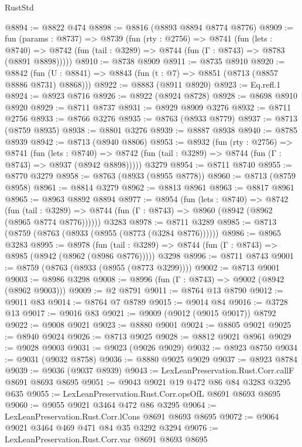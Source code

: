 \begin{lexlean}{RustStd}
\begin{coremodule}
@8894 := @8822 @474
@8898 := @8816 (@8893 @8894 @8774 @8776)
@8909 := fun (params : @8737) =>
  @8739
    (fun (rty : @2756) =>
    @8741
      (fun (lets : @8740) =>
      @8742 (fun (tail : @3289) => @8744 (fun (Γ : @8743) => @8783 (@8891 @8898)))))
@8910 := @8738 @8909
@8911 := @8735 @8910
@8920 := @8842 (fun (U : @8841) => @8843 (fun (t : @7) => @8851 (@8713 (@8857 @8886 @8731) @8868)))
@8922 := @8883 (@8911 @8920)
@8923 := Eq.refl.{1}
@8924 := @8923 @8716
@8926 := @8922 (@8924 @8728)
@8928 := @8698 @8910 @8920
@8929 := @8711 @8737
@8931 := @8929 @8909 @3276
@8932 := @8711 @2756
@8933 := @8766 @3276
@8935 := @8763 (@8933 @8779)
@8937 := @8713 (@8759 @8935)
@8938 := @8801 @3276
@8939 := @8887 @8938
@8940 := @8785 @8939
@8942 := @8713 (@8940 @8806)
@8953 := @8932
    (fun (rty : @2756) =>
    @8741
      (fun (lets : @8740) =>
      @8742 (fun (tail : @3289) => @8744 (fun (Γ : @8743) => @8937 (@8942 @8898)))))
    @3279
@8954 := @8711 @8740
@8955 := @8770 @3279
@8958 := @8763 (@8933 (@8955 @8778))
@8960 := @8713 (@8759 @8958)
@8961 := @8814 @3279
@8962 := @8813 @8961
@8963 := @8817 @8961
@8965 := @8963 @8892 @8894
@8977 := @8954
    (fun (lets : @8740) =>
    @8742
      (fun (tail : @3289) => @8744 (fun (Γ : @8743) => @8960 (@8942 (@8962 (@8965 @8774 @8776))))))
    @3283
@8978 := @8711 @3289
@8985 := @8713 (@8759 (@8763 (@8933 (@8955 (@8773 (@3284 @8776))))))
@8986 := @8965 @3283
@8995 := @8978
    (fun (tail : @3289) => @8744 (fun (Γ : @8743) => @8985 (@8942 (@8962 (@8986 @8776)))))
    @3298
@8996 := @8711 @8743
@9001 := @8759 (@8763 (@8933 (@8955 (@8773 @3299))))
@9002 := @8713 @9001
@9003 := @8986 @3298
@9008 := @8996 (fun (Γ : @8743) => @9002 (@8942 (@8962 @9003)))
@9009 := @2 @8791
@9011 := @8764 @13 @8790
@9012 := @9011 @83
@9014 := @8764 @7 @8789
@9015 := @9014 @84
@9016 := @3728 @13
@9017 := @9016 @83
@9021 := @9009 (@9012 (@9015 @9017)) @8792
@9022 := @9008 @9021
@9023 := @8880 @9001
@9024 := @8805 @9021
@9025 := @8940 @9024
@9026 := @8713 @9025
@9028 := @8812 @9021 @8961
@9029 := @9028 @9003
@9031 := @9023 (@9026 @9029)
@9032 := @8923 @8750
@9034 := @9031 (@9032 @8758)
@9036 := @8880 @9025 @9029
@9037 := @8923 @8784
@9039 := @9036 (@9037 @8939)
@9043 := LexLeanPreservation.Rust.Corr.callF @8691 @8693 @8695
@9051 := @9043 @9021 @19 @472 @86 @84 @3283 @3295 @635
@9055 := LexLeanPreservation.Rust.Corr.opsOfL @8691 @8693 @8695
@9060 := @9055 @9021 @3464 @472 @86 @3295
@9064 := LexLeanPreservation.Rust.Corr.lCons @8691 @8693 @8695
@9072 := @9064 @9021 @3464 @469 @471 @84 @35 @3292 @3294
@9076 := LexLeanPreservation.Rust.Corr.var @8691 @8693 @8695

\end{coremodule}
\end{lexlean}
